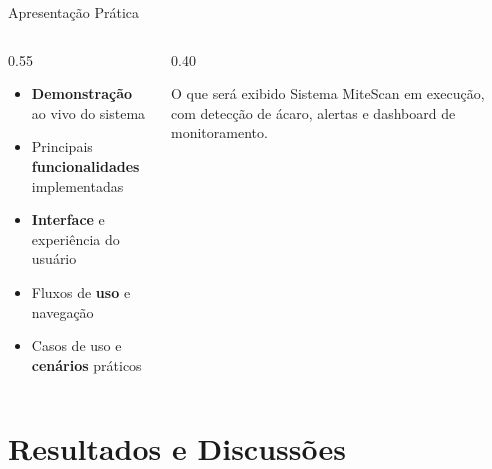 \documentclass[aspectratio=169]{beamer}
\begin{document}
\begin{frame}[b]{Apresentação Prática}
  \begin{columns}[T]
    \begin{column}{0.55\textwidth}
      \begin{itemize}
        \item \textbf{Demonstração} ao vivo do sistema
        \item Principais \textbf{funcionalidades} implementadas
        \item \textbf{Interface} e experiência do usuário
        \item Fluxos de \textbf{uso} e navegação
        \item Casos de uso e \textbf{cenários} práticos
      \end{itemize}
    \end{column}
    \begin{column}{0.40\textwidth}
      \begin{block}{\centering O que será exibido}
        \vspace{0.2em}
        {\scriptsize Sistema MiteScan em execução, com detecção de ácaro, alertas e dashboard de monitoramento.}
        \vspace{0.2em}
      \end{block}
    \end{column}
  \end{columns}
  \vfill
\end{frame}

\section{Resultados e Discussões}
\end{document}
